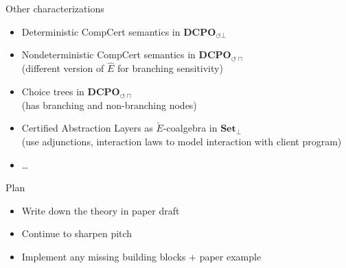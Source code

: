 \documentclass[aspectratio=1610,mathserif]{beamer}
\begin{document}
\begin{frame}{Other characterizations}
  \begin{itemize}
    \item Deterministic CompCert semantics
      in $\mathbf{DCPO}_{\circlearrowleft \bot}$
    \item Nondeterministic CompCert semantics 
      in $\mathbf{DCPO}_{\circlearrowleft \sqcap}$ \\
      (different version of $\hat{E}$ for branching sensitivity)
    \item Choice trees
      in $\mathbf{DCPO}_{\circlearrowleft \sqcap}$ \\
      (has branching and non-branching nodes)
    \item Certified Abstraction Layers
      as $\check{E}$-coalgebra in $\mathbf{Set}_\bot$ \\
      (use adjunctions, interaction laws to model interaction with client program)
    \item \ldots
  \end{itemize}
\end{frame}

\begin{frame}{Plan}
  \begin{itemize}
    \item Write down the theory in paper draft
    \item Continue to sharpen pitch
    \item Implement any missing building blocks + paper example
  \end{itemize}
\end{frame}
\end{document}
